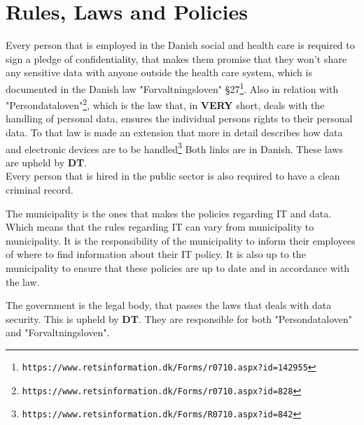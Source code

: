 \documentclass[11pt]{article}
\begin{document}
\section{Rules, Laws and Policies}
Every person that is employed in the Danish social and health care is required to sign a pledge of confidentiality, that makes them promise that they won't share any sensitive data with anyone outside the health care system, which is documented in the Danish law "Forvaltningsloven" §27\footnote{ \texttt{https://www.retsinformation.dk/Forms/r0710.aspx?id=142955} }. Also in relation with "Persondataloven"\footnote{ \texttt{https://www.retsinformation.dk/Forms/r0710.aspx?id=828} }, which is the law that, in \textbf{VERY} short, deals with the handling of personal data, ensures the individual persons rights to their personal data. To that law is made an extension that more in detail describes how data and electronic devices are to be handled\footnote{ \texttt{https://www.retsinformation.dk/Forms/R0710.aspx?id=842} } Both links are in Danish. These laws are upheld by \textbf{DT}.\\
Every person that is hired in the public sector is also required to have a clean criminal record.

The municipality is the ones that makes the policies regarding IT and data. Which means that the rules regarding IT can vary from municipality to municipality. It is the responsibility of the municipality to inform their employees of where to find information about their IT policy. It is also up to the municipality to ensure that these policies are up to date and in accordance with the law.

The government is the legal body, that passes the laws that deals with data security. This is upheld by \textbf{DT}. They are responsible for both "Persondataloven" and "Forvaltningsloven".
\end{document}
